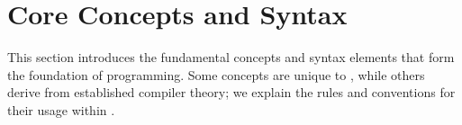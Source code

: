 \section{Core Concepts and  Syntax}

This section introduces the fundamental concepts and syntax elements that form the foundation of   programming. Some concepts are unique to , while others derive from established compiler theory; we explain the rules and conventions for their usage within  .














